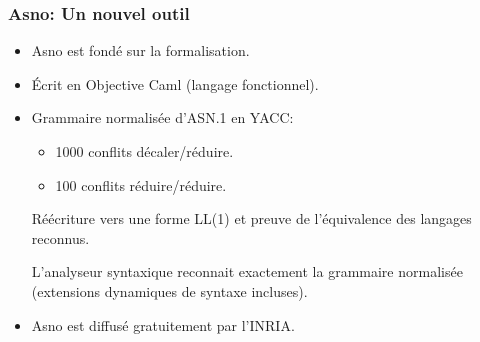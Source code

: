 \documentclass[compress,dvips,xcolor={dvipsnames},t]{beamer}
\begin{document}
\begin{frame}
\frametitle{\textsf{Asno}: Un nouvel outil}

\begin{itemize}

  \item \textsf{Asno} est fondé sur la formalisation.

  \item Écrit en Objective Caml (langage fonctionnel).

  \item Grammaire normalisée d'ASN.1 en YACC:

        \begin{itemize}

           \item[$\sim$] 1000 conflits décaler/réduire.

           \item[$\sim$] 100 conflits réduire/réduire.

        \end{itemize}

        Réécriture vers une forme LL(1) et preuve de l'équivalence des
        langages reconnus.

        L'analyseur syntaxique reconnait exactement la grammaire
        normalisée (extensions dynamiques de syntaxe incluses).

  \item \textsf{Asno} est diffusé gratuitement par l'INRIA.

\end{itemize}

\end{frame}
\end{document}
